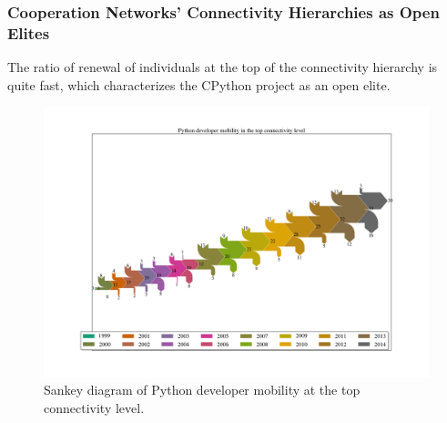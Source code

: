\documentclass[ignorenonframetext,red,8pt,notes=hide]{beamer}
\begin{document}
\begin{frame}
\frametitle{Cooperation Networks' Connectivity Hierarchies as Open Elites}

The ratio of renewal of individuals at the top of the connectivity hierarchy is quite fast, which characterizes the CPython project as an open elite.

\begin{figure}
\centering
\vspace{-0.2cm}
\hspace{-0.8cm}
\includegraphics[scale=0.23]{../../figures/sankey_mobility_python_years}
\caption{Sankey diagram of Python developer mobility at the top connectivity level.}
\end{figure}

\end{frame}
\end{document}
